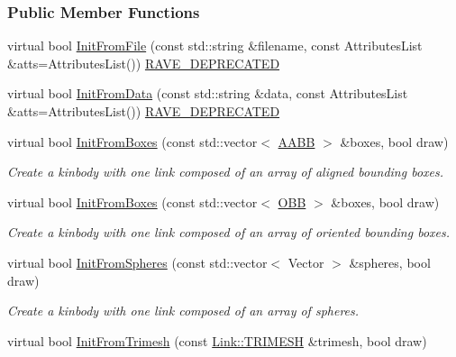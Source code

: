 \subsubsection*{Public Member Functions}
\begin{DoxyCompactItemize}
\item 
virtual bool \hyperlink{classOpenRAVE_1_1KinBody_ae67a1ee5e11749340bfbca5bd6749424}{InitFromFile} (const std::string \&filename, const AttributesList \&atts=AttributesList()) \hyperlink{namespaceOpenRAVE_af23fc4c2c72950a8c02f38ef71680bc6}{RAVE\_\-DEPRECATED}
\item 
virtual bool \hyperlink{classOpenRAVE_1_1KinBody_a3f81f529c6959894555ad8841a134431}{InitFromData} (const std::string \&data, const AttributesList \&atts=AttributesList()) \hyperlink{namespaceOpenRAVE_af23fc4c2c72950a8c02f38ef71680bc6}{RAVE\_\-DEPRECATED}
\item 
virtual bool \hyperlink{classOpenRAVE_1_1KinBody_a6ca8a1abee1479424de9c296da9cdd34}{InitFromBoxes} (const std::vector$<$ \hyperlink{classOpenRAVE_1_1geometry_1_1aabb}{AABB} $>$ \&boxes, bool draw)
\begin{DoxyCompactList}\small\item\em Create a kinbody with one link composed of an array of aligned bounding boxes. \item\end{DoxyCompactList}\item 
virtual bool \hyperlink{classOpenRAVE_1_1KinBody_a904bbbd6da53247d7f8e3ce1c3bac5b8}{InitFromBoxes} (const std::vector$<$ \hyperlink{classOpenRAVE_1_1geometry_1_1obb}{OBB} $>$ \&boxes, bool draw)
\begin{DoxyCompactList}\small\item\em Create a kinbody with one link composed of an array of oriented bounding boxes. \item\end{DoxyCompactList}\item 
virtual bool \hyperlink{classOpenRAVE_1_1KinBody_afe077907e74b0a8c7bdb53abc6a67fb1}{InitFromSpheres} (const std::vector$<$ Vector $>$ \&spheres, bool draw)
\begin{DoxyCompactList}\small\item\em Create a kinbody with one link composed of an array of spheres. \item\end{DoxyCompactList}\item 
virtual bool \hyperlink{classOpenRAVE_1_1KinBody_a9fbe9cf06cf411d8e93431552bdd4ebf}{InitFromTrimesh} (const \hyperlink{classOpenRAVE_1_1KinBody_1_1Link_1_1TRIMESH}{Link::TRIMESH} \&trimesh, bool draw)

\end{DoxyCompactItemize}
